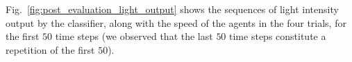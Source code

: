 Fig.~\ref{fig:post_evaluation_light_output} shows the sequences of light intensity output by the classifier, along with the speed of the agents in the four trials, for the first $50$ time steps (we observed that the last $50$ time steps constitute a repetition of the first $50$).
